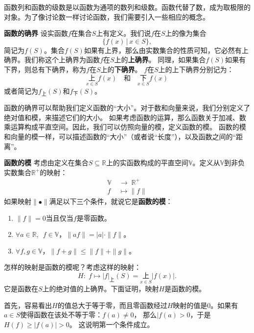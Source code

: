 \documentclass[12pt,UTF8]{ctexbook}
\begin{document}
\begin{appendix}
函数列和函数的级数是以函数为通项的数列和级数。函数代替了数，成为取极限的对象。为了像讨论数一样讨论函数，我们需要引入一些相应的概念。

\begin{df}{\textbf{函数的确界}}
    设实函数$f$在集合$S$上有定义。我们说$f$在$S$上的像为集合
    $$ \{f(x) \,|\, x\in S\}, $$
    简记为$f(S)$。集合$f(S)$如果有上界，那么由实数集合的性质可知，它必然有上确界。我们称这个上确界为函数$f$在$S$上的\textbf{上确界}。
    同理，如果集合$f(S)$如果有下界，则总有下确界，称为$f$在$S$上的\textbf{下确界}。
    $f$在$S$上的上下确界分别记为：
    $$ \underset{x\in S}{\text{上}} f(x) \quad \mbox{和} \quad \underset{x\in S}{\text{下}} f(x)$$
    或者简记为$f_{\text{上}}(S)$和$f_{\text{下}}(S)$。
\end{df}

函数的确界可以帮助我们定义函数的“大小”。对于数和向量来说，我们分别定义了绝对值和模，来描述它们的大小。
如果考虑函数的运算，那么函数关于加减、数乘运算构成平直空间。因此，我们可以仿照向量的模，定义函数的模。
函数的模和向量的模一样，可以描述函数的“大小”（或者说“长度”），以及函数之间的“距离”。
\begin{df}{\textbf{函数的模}}
    考虑由定义在集合$S\subseteq\mathbb{R}$上的实函数构成的平直空间$\mathbb{V}$。定义从$\mathbb{V}$到非负实数集合$\mathbb{R}^+$的映射：
    \begin{align*}
        \mathbb{V} \; &\rightarrow  \; \mathbb{R}^+ \\
        f &\mapsto \|f\|
    \end{align*}
    如果映射$\|\bullet \|$满足以下三个条件，就说它是\textbf{函数的模}：
    \begin{enumerate}
        \item $\|f\| = 0$当且仅当$f$是零函数。
        \item $\forall a\in\mathbb{R},\,\,\,f \in \mathbb{V}$，$\|af\| = |a| \cdot \|f\|$。
        \item $\forall f,g \in \mathbb{V}$，$\|f + g\| \leqslant \|f\| + \|g\|$。
    \end{enumerate}
\end{df}

怎样的映射是函数的模呢？考虑这样的映射：
$$ H:\; f \mapsto |f|_{\text{上}}(S) = \underset{x\in S}{\text{上}} |f(x)|. $$
它是函数在$S$上的绝对值的上确界。下面证明，映射$H$是函数的模。

首先，容易看出$H$的值总大于等于零，而且零函数经过$H$映射的值是$0$。如果有$a\in S$使得函数在该处不等于零：$f(a)\neq 0$，
那么$|f(a)>0$，于是$H(f) \geqslant |f(a)| > 0$。
这说明第一个条件成立。


\end{appendix}
\end{document}
